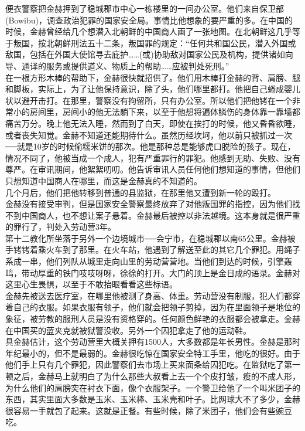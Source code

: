 \begin{multicols}{\theparacolNo}
便衣警察把金赫押到了稳城郡市中心一栋楼里的一间办公室。他们来自保卫部(Bowibu)，调查政治犯罪的国家安全局。事情比他想象的要严重的多。在中国的时候，金赫曾经给几个想潜入北朝鲜的中国商人画了一张地图。在北朝鲜这几乎等于叛国，按北朝鲜刑法五十二条，叛国罪的规定：“任何共和国公民，潜入外国或敌国，包括在外国大使馆寻去庇护……(或)协助敌对国家公民及机构，提供诸如向导、通译的服务或提供道义、物质上的帮助……应被判处死刑。”\\

在一根方形木棒的帮助下，金赫很快就招供了。他们用木棒打金赫的背、肩膀、腿和脚板，实际上，为了让他保持意识，除了头，他们哪里都打。他把自己蜷成婴儿状以避开击打。在那里，警察没有拘留所，只有办公室。所以他们把他铐在一个非常小的房间里，房间小的他无法躺下来，以至于他想将遍体鳞伤的身体靠一靠墙都痛苦万分。晚上他无法入睡，然而到了白天，即使在挨打的时候，他又昏昏欲睡，或者丧失知觉。金赫不知道还能期待什么。虽然历经坎坷，他以前只被抓过一次──就是10岁的时候偷糯米饼的那次。他是那种总是能够虎口脱险的孩子。现在，情况不同了，他被当成一个成人，犯有严重罪行的罪犯。他感到无助、失败、没有尊严。在审讯期间，他絮絮叨叨。他告诉审讯人员任何他们想知道的事情，但他们只想知道中国商人在哪里，而这是金赫真的不知道的。\\

几个月后，他们把他转移到普通的县监狱，在那里他又遭到新一轮的殴打。\\

金赫没有接受审判，但是国家安全警察最终放弃了对他叛国罪的指控，因为他们找不到中国商人，也不想让案子悬着。金赫最后被控以非法越境。这本身就是很严重的罪行了，判处入劳动营3年。\\

第十二教化所坐落于另外一个边境城市──会宁市，在稳城郡以南65公里。金赫被手铐铐着乘火车到了那里。在火车站，他遇到了解送至此的其它几个罪犯。用绳子系成一串，他们列队从城里走向山里的劳动营营地。当他们到达的时候，引擎轰鸣，带动厚重的铁门吱吱呀呀，徐徐的打开。大门的顶上是金日成的语录。金赫对这里心生畏惧，以至于不敢抬眼看看这些标语。\\

金赫先被送去医疗室，在哪里他被测了身高、体重。劳动营没有制服，犯人们都穿着自己的衣服。如果衣服有领子，他们就会把领子剪掉，因为在里面领子是地位的象征，被劳教的服刑人员是没有资格穿的。任何颜色鲜艳的衣服都会被拿走。金赫在中国买的蓝夹克就被狱警没收。另外一个囚犯拿走了他的运动鞋。\\

具金赫估计，这个劳动营里大概关押有1500人，大多数都是年长男性。金赫是那时年纪最小的，但不是最弱的。金赫很吃惊在国家安全特工手里，他吃的很好。由于他们手上只有几个罪犯，因此警察们去市场上买来面条给囚犯吃。在监狱吃了第一顿之后，金赫马上就明白了为什么那些大叔看上去一个个皮打皱，瘦的不成人形，为什么他们的肩膀突在衬衣下面，像个衣服架子。一个警卫给他了一个叫米团子的东西，其实里面大多数是玉米、玉米棒、玉米壳和叶子。比网球大不了多少，金赫很容易一手就包了起来。这就是正餐。有些时候，除了米团子，他们会有些豌豆吃。\\


\end{multicols}
